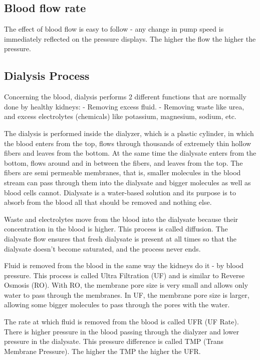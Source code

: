 \documentclass[
  11pt,
  letterpaper,
  DIV=11,
  numbers=noendperiod]{scrreprt}
\begin{document}
\subsection{Blood flow rate}\label{blood-flow-rate}

The effect of blood flow is easy to follow - any change in pump speed is
immediately reflected on the pressure displays. The higher the flow the
higher the pressure.

\subsection{Dialysis Process}\label{dialysis-process}

Concerning the blood, dialysis performs 2 different functions that are
normally done by healthy kidneys: - Removing excess fluid. - Removing
waste like urea, and excess electrolytes (chemicals) like potassium,
magnesium, sodium, etc.

The dialysis is performed inside the dialyzer, which is a plastic
cylinder, in which the blood enters from the top, flows through
thousands of extremely thin hollow fibers and leaves from the bottom. At
the same time the dialysate enters from the bottom, flows around and in
between the fibers, and leaves from the top. The fibers are semi
permeable membranes, that is, smaller molecules in the blood stream can
pass through them into the dialysate and bigger molecules as well as
blood cells cannot. Dialysate is a water-based solution and its purpose
is to absorb from the blood all that should be removed and nothing else.

Waste and electrolytes move from the blood into the dialysate because
their concentration in the blood is higher. This process is called
diffusion. The dialysate flow ensures that fresh dialysate is present at
all times so that the dialysate doesn't become saturated, and the
process never ends.

Fluid is removed from the blood in the same way the kidneys do it - by
blood pressure. This process is called Ultra Filtration (UF) and is
similar to Reverse Osmosis (RO). With RO, the membrane pore size is very
small and allows only water to pass through the membranes. In UF, the
membrane pore size is larger, allowing some bigger molecules to pass
through the pores with the water.

The rate at which fluid is removed from the blood is called UFR (UF
Rate). There is higher pressure in the blood passing through the
dialyzer and lower pressure in the dialysate. This pressure difference
is called TMP (Trans Membrane Pressure). The higher the TMP the higher
the UFR.
\end{document}
